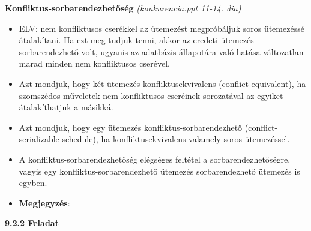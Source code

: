 \documentclass[a4paper,11.5pt, table]{article}
\begin{document}
	{\large \textbf{Konfliktus-sorbarendezhetőség}} \textit{(konkurencia.ppt 11-14. dia)}
	\begin{itemize}
		\item ELV: nem konfliktusos cserékkel az ütemezést megpróbáljuk soros ütemezéssé átalakítani. Ha ezt meg tudjuk tenni, akkor az eredeti ütemezés sorbarendezhető volt, ugyanis az adatbázis állapotára való hatása változatlan marad minden nem konfliktusos cserével.
		
		\item Azt mondjuk, hogy két ütemezés konfliktusekvivalens (conflict-equivalent), ha szomszédos műveletek nem konfliktusos cseréinek sorozatával az egyiket átalakíthatjuk a másikká. 
		
		\item Azt mondjuk, hogy egy ütemezés konfliktus-sorbarendezhető (conflict-serializable schedule), ha konfliktusekvivalens valamely soros ütemezéssel. 
		
		\item A konfliktus-sorbarendezhetőség elégséges feltétel a sorbarendezhetőségre, vagyis egy konfliktus-sorbarendezhető ütemezés sorbarendezhető ütemezés is egyben. 
		
		\item \textbf{Megjegyzés}:
	\end{itemize}

	{\large \textbf{9.2.2 Feladat}}
	
\end{document}
